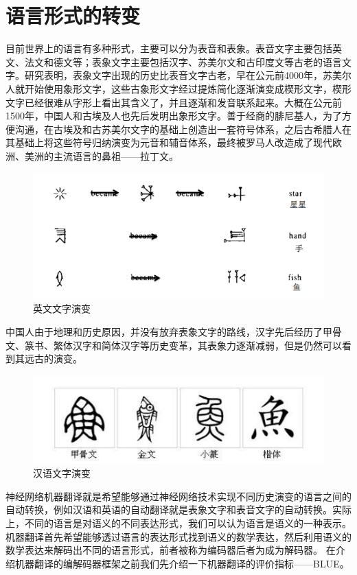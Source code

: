 \documentclass[twoside,a4paper,12pt]{book}%
\begin{document}
\section{语言形式的转变}
目前世界上的语言有多种形式，主要可以分为表音和表象。表音文字主要包括英文、法文和德文等；表象文字主要包括汉字、苏美尔文和古印度文等古老的语言文字。研究表明，表象文字出现的历史比表音文字古老，早在公元前4000年，苏美尔人就开始使用象形文字，这些古象形文字经过提炼简化逐渐演变成楔形文字，楔形文字已经很难从字形上看出其含义了，并且逐渐和发音联系起来。大概在公元前1500年，中国人和古埃及人也先后发明出象形文字。善于经商的腓尼基人，为了方便沟通，在古埃及和古苏美尔文字的基础上创造出一套符号体系，之后古希腊人在其基础上将这些符号归纳演变为元音和辅音体系，最终被罗马人改造成了现代欧洲、美洲的主流语言的鼻祖——拉丁文。
\begin{figure}[H]
\begin{center}
\includegraphics[width=6.0in]{figures/lan_evolve1.png}
\caption{英文文字演变}
\label{fig:lan_evolve1}
\end{center}
\end{figure}
中国人由于地理和历史原因，并没有放弃表象文字的路线，汉字先后经历了甲骨文、篆书、繁体汉字和简体汉字等历史变革，其表象力逐渐减弱，但是仍然可以看到其远古的演变。
\begin{figure}[H]
\begin{center}
\includegraphics[width=6.0in]{figures/lan_evolve2.png}
\caption{汉语文字演变}
\label{fig:lan_evolve2}
\end{center}
\end{figure}
神经网络机器翻译就是希望能够通过神经网络技术实现不同历史演变的语言之间的自动转换，例如汉语和英语的自动翻译就是表象文字和表音文字的自动转换。实际上，不同的语言是对语义的不同表达形式，我们可以认为语言是语义的一种表示。机器翻译首先希望能够透过语言的表达形式找到语义的数学表达，然后利用语义的数学表达来解码出不同的语言形式，前者被称为编码器后者为成为解码器。
在介绍机器翻译的编解码器框架之前我们先介绍一下机器翻译的评价指标——BLUE。
\end{document}

